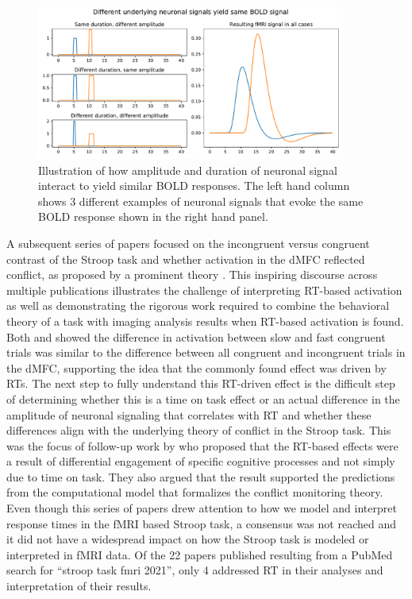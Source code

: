 \documentclass[titlepage,12pt] {article}
\begin{document}
 \begin{figure}[h!]
  \centering
   \includegraphics[width=4in]{Figures/neuron_same_bold.pdf}
   \caption{Illustration of how amplitude and duration of neuronal signal interact to yield similar BOLD responses.  The left hand column shows 3 different examples of neuronal signals that evoke the same BOLD response shown in the right hand panel.   }
  \label{fig:neuron_bold}
 \end{figure}

A subsequent series of papers focused on the incongruent versus congruent contrast of the Stroop task and whether activation in the dMFC reflected conflict, as proposed by a prominent theory \citep{botvinick2001}.  This inspiring discourse across multiple publications illustrates the challenge of interpreting RT-based activation as well as demonstrating the rigorous work required to combine the behavioral theory of a task with imaging analysis results when RT-based activation is found.  Both \citet{grinband_dorsal_2011} and \citet{carp_conditional_2010} showed the difference in activation between slow and fast congruent trials was similar to the difference between all congruent and incongruent trials in the dMFC, supporting the idea that the commonly found effect was driven by RTs.   The next step to fully understand this RT-driven effect is the difficult step of determining whether this is a time on task effect or an actual difference in the amplitude of neuronal signaling that correlates with RT and whether these differences align with the underlying theory of conflict in the Stroop task.  This was the focus of follow-up work by \citet{yeung_errors_2011} who proposed that the RT-based effects were a result of differential engagement of specific cognitive processes and not simply due to time on task. They also argued that the result supported the predictions from the computational model that formalizes the conflict monitoring theory.   Even though this series of papers drew attention to how we model and interpret response times in the fMRI based Stroop task, a consensus was not reached \citep{brown_medial_2011, grinbandConflictErrorLikelihood2011,nachevBlindExecutive2011} and it did not have a widespread impact on how the Stroop task is modeled or interpreted in fMRI data. Of the 22 papers published resulting from a PubMed search for ``stroop task fmri 2021'', only 4 addressed RT in their analyses and interpretation of their results.  
\end{document}
